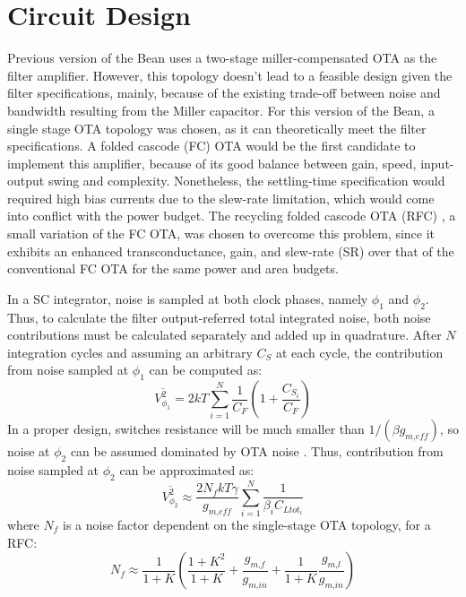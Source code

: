 \section{Circuit Design}
Previous version of the Bean uses a two-stage miller-compensated OTA as the filter amplifier. However, this topology doesn't lead to a feasible design given the filter specifications, mainly, because of the existing trade-off between noise and bandwidth resulting from the Miller capacitor. For this version of the Bean, a single stage OTA topology was chosen, as it can theoretically meet the filter specifications.  A folded cascode (FC) OTA would be the first candidate to implement this amplifier, because of its good balance between gain, speed, input-output swing and complexity. Nonetheless, the settling-time specification would required high bias currents due to the slew-rate limitation, which would come into conflict with the power budget. The recycling folded cascode OTA (RFC) \citep{assaad101}, a small variation of the FC OTA, was chosen to overcome this problem, since it exhibits an enhanced transconductance, gain, and slew-rate (SR) over that of the conventional FC OTA for the same power and area budgets.


In a SC integrator, noise is sampled at both clock phases, namely $\phi_1$ and $\phi_2$. Thus, to calculate the filter output-referred total integrated noise, both noise contributions must be calculated separately and added up in quadrature. After $N$ integration cycles and assuming an arbitrary $C_S$ at each cycle, the contribution from noise sampled at $\phi_1$ can be computed as:
\begin{equation}
\overline{V_{\phi_1}^2} = 2 kT \sum_{i=1}^{N} \frac{1}{C_F}\left(1 + \frac{C_{S_i}}{C_F}\right)
\end{equation}
In a proper design, switches resistance will be much smaller than $1/(\beta g_\textit{m,eff})$, so noise at $\phi_2$ can be assumed dominated by OTA noise \citep{vleugels101}. Thus, contribution from noise sampled at $\phi_2$ can be approximated as:
\begin{equation}
\overline{V_{\phi_2}^2} \approx \frac{2 N_f kT\gamma}{g_\textit{m,eff}} \sum_{i=1}^{N} \frac{1}{\beta_i C_{Ltot_i}}
\end{equation}
where $N_f$ is a noise factor dependent on the single-stage OTA topology, for a RFC:
\begin{equation}
N_f \approx \frac1{1+K}\left(\frac{1+K^2}{1+K} + \frac{g_\textit{m,f}}{g_\textit{m,in}} + \frac1{1+K}\frac{g_\textit{m,l}}{g_\textit{m,in}}\right)
\end{equation}

